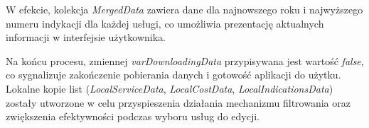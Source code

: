 W efekcie, kolekcja \emph{MergedData} zawiera dane dla najnowszego roku i najwyższego numeru indykacji dla każdej usługi, co umożliwia prezentację aktualnych informacji w interfejsie użytkownika.

Na końcu procesu, zmiennej \emph{varDownloadingData} przypisywana jest wartość \emph{false}, co sygnalizuje zakończenie pobierania danych i gotowość aplikacji do użytku. Lokalne kopie list (\emph{LocalServiceData}, \emph{LocalCostData}, \emph{LocalIndicationsData}) zostały utworzone w celu przyspieszenia działania mechanizmu filtrowania oraz zwiększenia efektywności podczas wyboru usług do edycji.




